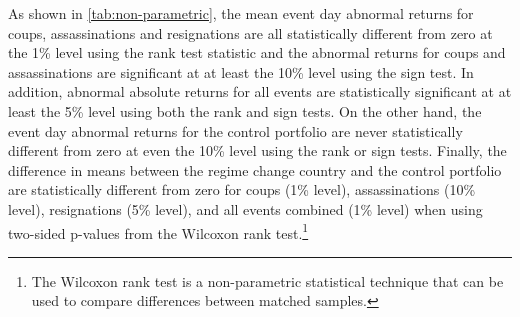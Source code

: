\documentclass[12pt,final,fleqn]{article}
\theoremstyle{plain}
\newcommand\var{{\rm Var}}
\begin{document}
As shown in \autoref{tab:non-parametric}, the mean event day abnormal returns for coups, assassinations and resignations are all statistically different from zero at the 1\% level using the rank test statistic and the abnormal returns for coups and assassinations are significant at at least the 10\% level using the sign test. In addition, abnormal absolute returns for all events are statistically significant at at least the 5\% level using both the rank and sign tests. On the other hand, the event day abnormal returns for the control portfolio are never statistically different from zero at even the 10\% level using the rank or sign tests. Finally, the difference in means between the regime change country and the control portfolio are statistically different from zero for coups (1\% level), assassinations (10\% level), resignations (5\% level), and all events combined (1\% level) when using two-sided p-values from the Wilcoxon rank test.\footnote{The Wilcoxon rank test is a non-parametric statistical technique that can be used to compare differences between matched samples.} 
%






%
\end{document}
